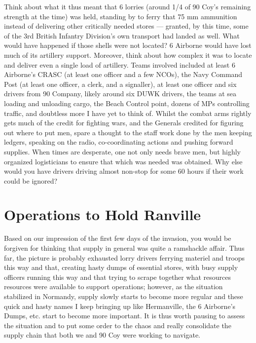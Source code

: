 \documentclass[noraggedright]{turabian-researchpaper}
\begin{document}
Think about what it thus meant that 6 lorries (around 1/4 of 90 Coy's remaining
strength at the time) was held, standing by to ferry that 75 mm ammunition 
instead of delivering other critically needed stores --- granted, by this time,
some of
the 3rd British Infantry Division's own transport had landed as well.  What
would have happened if those shells were not located?  6 Airborne would have
lost much of its artillery support.  Moreover, think about how complex it was
to locate and deliver even a single load of artillery.  Teams involved included
at least 6 Airborne's CRASC (at least one officer and a few NCOs), the Navy
Command Post (at least one officer, a clerk, and a signaller), at least one
officer and six drivers from 90 Company, likely around six DUWK drivers, the
teams at sea loading and unloading cargo, the Beach Control point, dozens of 
MPs controlling traffic, and doubtless more I have yet to think of.  Whilst 
the combat arms rightly gets much of the credit for fighting wars, and the
Generals credited for figuring out where to put men, spare a thought to the
staff work done by the men keeping ledgers, speaking on the radio, 
co-coordinating actions and pushing forward supplies.  When times are desperate, 
one not only needs brave men, but highly organized logisticians to ensure
that which was needed was obtained. Why else would you have drivers driving
almost non-stop for some 60 hours if their work could be ignored?



\section{Operations to Hold Ranville} %

Based on our impression of the first few days of the invasion, you would be 
forgiven for thinking that supply in general was quite a ramshackle affair.
Thus far, the picture is probably exhausted lorry drivers ferrying materiel and
troops this way and that, creating hasty dumps of essential stores, with busy
supply officers running this way and that trying to scrape together what 
resources resources were available to support operations; however, as the
situation stabilized in Normandy, supply slowly starts to become more regular
and these quick and hasty names I keep bringing up like Hermanville, the
6 Airborne's Dumps, etc. start to become more important.  It is thus
worth pausing to assess the situation and to put some order to the chaos and
really consolidate the supply chain that both we and 90 Coy were working to 
navigate. 
\end{document}
